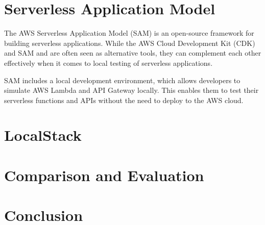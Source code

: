 \documentclass{article}
\begin{document}
\section{Serverless Application Model}
The AWS Serverless Application Model (SAM) is an open-source framework for building serverless applications.
While the AWS Cloud Development Kit (CDK) and SAM and  are often seen as alternative tools, they can complement each other effectively when it comes to local testing of serverless applications.

SAM includes a local development environment, which allows developers to simulate AWS Lambda and API Gateway locally. This enables them to test their serverless functions and APIs without the need to deploy to the AWS cloud.


\section{LocalStack}

\section{Comparison and Evaluation}

\section{Conclusion}
\end{document}
